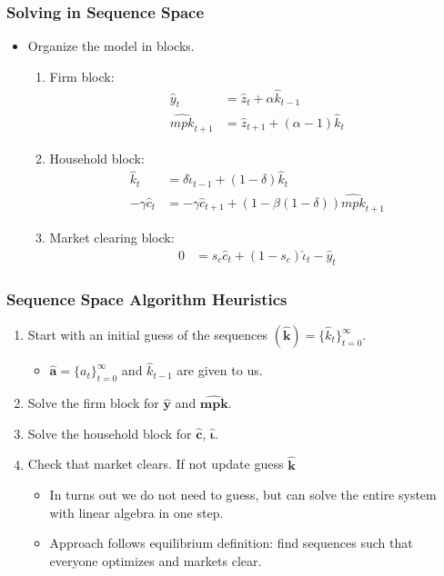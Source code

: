 \documentclass[english,xcolor=svgnames]{beamer}
\begin{document}
\begin{frame}
	\frametitle{Solving in Sequence Space}
	\begin{itemize}
		\item Organize the model in blocks.
		\begin{enumerate}
			\item Firm block:
			\begin{align*}
				\hat{y}_t &= \hat{z}_t + \alpha \hat{k}_{t-1} \\
				\hat{mpk}_{t+1} &=  \hat{z}_{t+1} + (\alpha-1) \hat{k}_t 
			\end{align*}
			\item Household block:
			\begin{align*}
				\hat{k}_{t} &=\delta \hat{\iota}_{t-1} + (1-\delta)\hat{k}_t \\
				- \gamma \hat{c}_t &= -\gamma  \hat{c}_{t+1} + (1 - \beta(1-\delta))  \hat{mpk}_{t+1} 
			\end{align*}
			\item Market clearing block:
			\begin{align*}
				0&=s_c \hat{c}_t +(1-s_c) \hat{\iota}_t - \hat{y}_t 
			\end{align*}
		\end{enumerate}
	\end{itemize}
	\end{frame}


	
	\begin{frame}
		\frametitle{Sequence Space Algorithm Heuristics}
			\begin{enumerate}
				\item Start with an initial guess of the sequences $(\mathbf{\hat{k}})=\{\hat{k}_{t}\}_{t=0}^{\infty}$.
				\begin{itemize}
					\item $\mathbf{\hat{a}}=\{a_t\}_{t=0}^{\infty}$ and $\hat{k}_{t-1}$ are given to us.
				\end{itemize}
				\item Solve the firm block for $\mathbf{\hat{y}}$ and $\mathbf{\hat{mpk}}$.
				\item Solve the household block for $\mathbf{\hat{c}}$, $\mathbf{\hat{\iota}}$.
				\item Check that market clears. If not update guess $\mathbf{\hat{k}}$
				\begin{itemize}
					\item In turns out we do not need to guess, but can solve the entire system with linear algebra in one step.
					\item Approach follows equilibrium definition: find sequences such that everyone optimizes and markets clear.
				\end{itemize}
			\end{enumerate}
	\end{frame}
	
\end{document}
